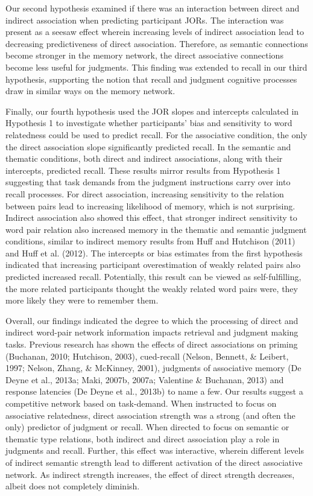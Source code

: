 \documentclass[english,,man]{apa6}
\begin{document}
Our second hypothesis examined if there was an interaction between direct and indirect association when predicting participant JORs. The interaction was present as a seesaw effect wherein increasing levels of indirect association lead to decreasing predictiveness of direct association. Therefore, as semantic connections become stronger in the memory network, the direct associative connections become less useful for judgments. This finding was extended to recall in our third hypothesis, supporting the notion that recall and judgment cognitive processes draw in similar ways on the memory network.

Finally, our fourth hypothesis used the JOR slopes and intercepts calculated in Hypothesis 1 to investigate whether participants' bias and sensitivity to word relatedness could be used to predict recall. For the associative condition, the only the direct association slope significantly predicted recall. In the semantic and thematic conditions, both direct and indirect associations, along with their intercepts, predicted recall. These results mirror results from Hypothesis 1 suggesting that task demands from the judgment instructions carry over into recall processes. For direct association, increasing sensitivity to the relation between pairs lead to increasing likelihood of memory, which is not surprising. Indirect association also showed this effect, that stronger indirect sensitivity to word pair relation also increased memory in the thematic and semantic judgment conditions, similar to indirect memory results from Huff and Hutchison (2011) and Huff et al. (2012). The intercepts or bias estimates from the first hypothesis indicated that increasing participant overestimation of weakly related pairs also predicted increased recall. Potentially, this result can be viewed as self-fulfilling, the more related participants thought the weakly related word pairs were, they more likely they were to remember them.

Overall, our findings indicated the degree to which the processing of direct and indirect word-pair network information impacts retrieval and judgment making tasks. Previous research has shown the effects of direct associations on priming (Buchanan, 2010; Hutchison, 2003), cued-recall (Nelson, Bennett, \& Leibert, 1997; Nelson, Zhang, \& McKinney, 2001), judgments of associative memory (De Deyne et al., 2013a; Maki, 2007b, 2007a; Valentine \& Buchanan, 2013) and response latencies (De Deyne et al., 2013b) to name a few. Our results suggest a competitive network based on task-demand. When instructed to focus on associative relatedness, direct association strength was a strong (and often the only) predictor of judgment or recall. When directed to focus on semantic or thematic type relations, both indirect and direct association play a role in judgments and recall. Further, this effect was interactive, wherein different levels of indirect semantic strength lead to different activation of the direct associative network. As indirect strength increases, the effect of direct strength decreases, albeit does not completely diminish.
\end{document}
